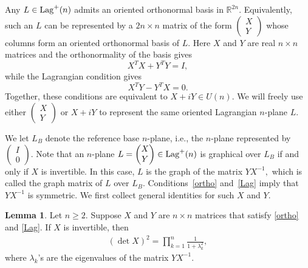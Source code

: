 \documentclass[11pt]{amsart}
\numberwithin{equation}{section}
\theoremstyle{definition}
\theoremstyle{definition}
\newtheorem{lemma}[equation]{Lemma}
\begin{document}
Any $L \in {\rm Lag}^{+}(n)$ admits an oriented orthonormal basis in \(\mathbb{R}^{2n}\). 
Equivalently, such an $L$ can be represented by a
\(2n \times n\) matrix of the form
$\begin{pmatrix}
X \\
Y
\end{pmatrix}$
whose columns form an oriented orthonormal basis of $L$. Here \(X\) and \(Y\) are real \(n \times n\) matrices and the orthonormality of the basis gives
\begin{equation}\label{ortho}
X^{T}X+Y^{T}Y=I,
\end{equation}
while the Lagrangian condition gives
\begin{equation}\label{Lag}
X^{T}Y-Y^{T}X=0.
\end{equation}
Together, these conditions are equivalent to $X+iY \in U(n).$
We will freely use either
$\begin{pmatrix}
X \\
Y
\end{pmatrix}$ 
or $X+iY$ to represent the same oriented Lagrangian $n$-plane \(L\).




We let $L_B$ denote the reference base $n$-plane, i.e., the $n$-plane represented by $\begin{pmatrix}
I\\0
\end{pmatrix}.$
Note that an $n$-plane $L=\begin{pmatrix}
X\\Y
\end{pmatrix}\in{\rm Lag}^+(n)$ is graphical over $L_B$ if and only if $X$ is invertible.  
In this case, $L$ is the graph of the matrix $YX^{-1},$ which is called the graph matrix of $L$ over $L_B.$ 
Conditions~\eqref{ortho} and~\eqref{Lag} imply that $YX^{-1}$ is symmetric. 
We first collect general identities for such $X$ and $Y.$

\begin{lemma}
	\label{lem:detX>0}
	Let $n\ge 2.$ 
	Suppose $X$ and $Y$ are $n\times n$ matrices that satisfy \eqref{ortho} and \eqref{Lag}. 
	If $X$ is invertible, then
	\begin{align*}
	(\det X)^2
	= \prod_{k=1}^n \frac 1{1+\lambda_k^2}, 
	\end{align*} where $\lambda_k$'s are the eigenvalues of the matrix $YX^{-1}$.
\end{lemma}
\end{document}
